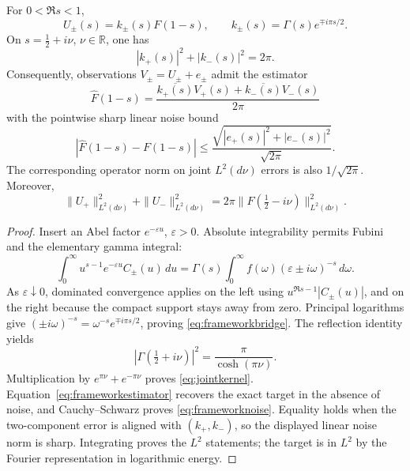 \begin{proposition}
\label{prop:frameworkbridge}
For $0<\Re s<1$,
\begin{equation}\label{eq:frameworkbridge}
 U_\pm(s)=k_\pm(s)F(1-s),\qquad
 k_\pm(s)=\Gamma(s)e^{\mp i\pi s/2}.
\end{equation}
On $s=\frac12+i\nu$, $\nu\in\mathbb R$, one has
\begin{equation}\label{eq:jointkernel}
 |k_+(s)|^2+|k_-(s)|^2=2\pi.
\end{equation}
Consequently, observations $V_\pm=U_\pm+e_\pm$ admit the estimator
\begin{equation}\label{eq:frameworkestimator}
 \widehat F(1-s)=\frac{\overline{k_+(s)}V_+(s)
                         +\overline{k_-(s)}V_-(s)}{2\pi}
\end{equation}
with the pointwise sharp linear noise bound
\begin{equation}\label{eq:frameworknoise}
 |\widehat F(1-s)-F(1-s)|
 \le\frac{\sqrt{|e_+(s)|^2+|e_-(s)|^2}}{\sqrt{2\pi}}.
\end{equation}
The corresponding operator norm on joint $L^2(d\nu)$ errors is also
$1/\sqrt{2\pi}$. Moreover,
\[
 \|U_+\|_{L^2(d\nu)}^2+\|U_-\|_{L^2(d\nu)}^2
 =2\pi\|F(\tfrac12-i\nu)\|_{L^2(d\nu)}^2.
\]
\end{proposition}
\begin{proof}
Insert an Abel factor $e^{-\varepsilon u}$, $\varepsilon>0$.
Absolute integrability permits Fubini and the elementary gamma integral:
\[
 \int_0^\infty u^{s-1}e^{-\varepsilon u}C_\pm(u)\,du
 =\Gamma(s)\int_0^\infty
       f(\omega)(\varepsilon\pm i\omega)^{-s}\,d\omega.
\]
As $\varepsilon\downarrow0$, dominated convergence applies on the
left using $u^{\Re s-1}|C_\pm(u)|$, and on the right because the
compact support stays away from zero. Principal logarithms give
$(\pm i\omega)^{-s}=\omega^{-s}e^{\mp i\pi s/2}$, proving
\eqref{eq:frameworkbridge}. The reflection identity yields
\[
 |\Gamma(\tfrac12+i\nu)|^2=\frac\pi{\cosh(\pi\nu)}.
\]
Multiplication by $e^{\pi\nu}+e^{-\pi\nu}$ proves
\eqref{eq:jointkernel}. Equation~\eqref{eq:frameworkestimator}
recovers the exact target in the absence of noise, and Cauchy--Schwarz
proves \eqref{eq:frameworknoise}. Equality holds when the two-component
error is aligned with $(k_+,k_-)$, so the displayed linear noise norm
is sharp. Integrating proves the $L^2$ statements; the target is in
$L^2$ by the Fourier representation in logarithmic energy.
\end{proof}

